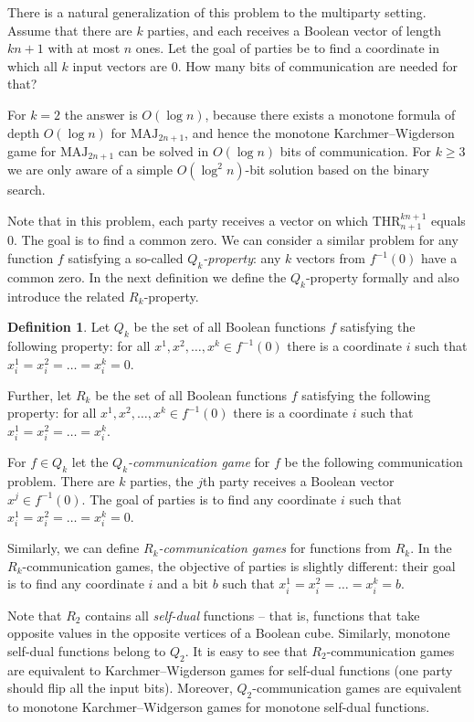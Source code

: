 \documentclass[11pt]{article}
\numberwithin{equation}{section}
\theoremstyle{definition}
\newtheorem{definition}[theorem]{Definition}
\theoremstyle{plain}
\def\MAJ{\mathrm{MAJ}}
\def\THR{\mathrm{THR}}
\begin{document}
There is a natural generalization of this problem to the multiparty setting.
%
Assume that there are $k$ parties, and each receives a Boolean vector of length $kn + 1$ with at most $n$ ones. Let the goal of parties be to find a coordinate in which all $k$ input vectors are $0$. How many bits of communication are needed for that?

For $k = 2$ the answer is $O(\log n)$, because there exists 
%
a monotone formula of depth $O(\log n)$  %
for $\MAJ_{2n + 1}$, and hence the monotone Karchmer--Wigderson game for $\MAJ_{2n + 1}$ can be solved in $O(\log n)$ bits of communication. For $k \ge 3$ we are only aware of a simple $O(\log^2 n)$-bit solution based on the binary search.

Note that in this problem, each party receives a vector on which $\THR^{kn + 1}_{n + 1}$ equals $0$. The goal is to find a common zero.  We can consider a similar problem for any function $f$ satisfying a so-called \emph{$Q_k$-property}: any $k$ vectors from $f^{-1}(0)$ have a common zero. In the next definition we define the $Q_k$-property formally and also introduce the related $R_k$-property.



\begin{definition}
Let $Q_k$ be the set of all Boolean functions $f$ satisfying the following property: for all $x^1, x^2, \ldots, x^k\in f^{-1}(0)$ there is a coordinate $i$ such that $x^1_i = x^2_i = \ldots =  x^k_i = 0$.

Further, let $R_k$ be the set of all Boolean functions $f$  satisfying the following property: for all $x^1, x^2, \ldots, x^k\in f^{-1}(0)$ there is a coordinate $i$ such that $x^1_i = x^2_i = \ldots =  x^k_i$.
\end{definition}



For $f\in Q_k$ let the \emph{$Q_k$-communication game} for $f$  be the following communication problem. There are $k$ parties, the $j$th party receives a Boolean vector $x^j\in f^{-1}(0)$. The goal of parties is to find any coordinate $i$ such that $x^1_i = x^2_i = \ldots = x^k_i = 0$.

Similarly, we can define \emph{$R_k$-communication games} for functions from $R_k$. In the $R_k$-commu\-ni\-ca\-tion %
%
games, the objective of parties is slightly different: their goal is to find any coordinate $i$  and a bit $b$ such that $x^1_i = x^2_i = \ldots = x^k_i = b$.

Note that $R_2$ contains all \emph{self-dual} functions -- that is, functions that take opposite values in the opposite vertices of a Boolean cube.
Similarly, monotone self-dual functions belong to $Q_2$. It is easy to see that $R_2$-communication games are equivalent to Karchmer--Wigderson games for self-dual functions (one party should flip all the input bits). Moreover, $Q_2$-communication games are equivalent to monotone Karchmer--Widgerson games for monotone self-dual functions. 
\end{document}

